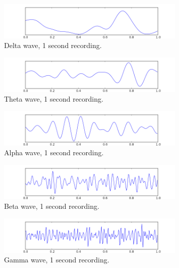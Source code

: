 \documentclass[12pt, a4paper, fleqn]{memoir}%
\begin{document}
\begin{figure}[p]
	\centering
	\includegraphics[width=0.8\textwidth]{eeg_delta.png}
	\caption{Delta wave, 1 second recording.}	
\end{figure}

\begin{figure}[p]
	\centering
	\includegraphics[width=0.8\textwidth]{eeg_theta.png}
	\caption{Theta wave, 1 second recording.}	
\end{figure}

\begin{figure}[p]
	\centering
	\includegraphics[width=0.8\textwidth]{eeg_alpha.png}
	\caption{Alpha wave, 1 second recording.}	
\end{figure}

\begin{figure}[p]
	\centering
	\includegraphics[width=0.8\textwidth]{eeg_beta.png}
	\caption{Beta wave, 1 second recording.}	
\end{figure}

\begin{figure}[p]
	\centering
	\includegraphics[width=0.8\textwidth]{eeg_gamma.png}
	\caption{Gamma wave, 1 second recording.}	
\end{figure}
\end{document}
